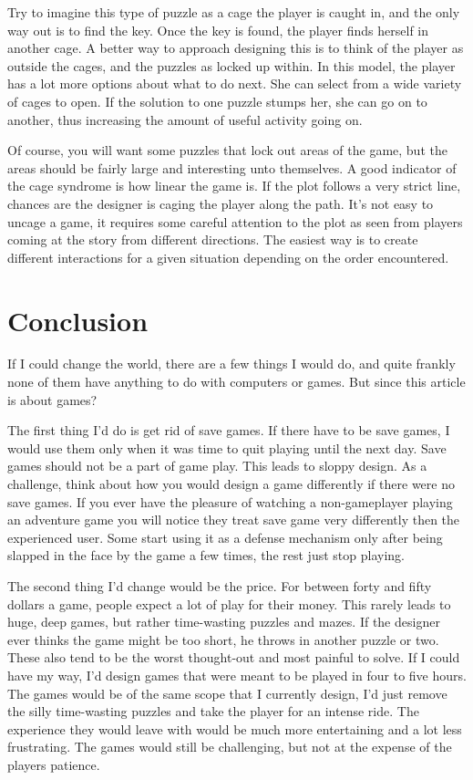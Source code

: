 \documentclass[12pt,letterpaper]{article}
\begin{document}
Try to imagine this type of puzzle as a cage the player is caught in, and the
only way out is to find the key. Once the key is found, the player finds
herself in another cage. A better way to approach designing this is to think of
the player as outside the cages, and the puzzles as locked up within. In this
model, the player has a lot more options about what to do next. She can select
from a wide variety of cages to open. If the solution to one puzzle stumps her,
she can go on to another, thus increasing the amount of useful activity going
on.

Of course, you will want some puzzles that lock out areas of the game, but the
areas should be fairly large and interesting unto themselves. A good indicator
of the cage syndrome is how linear the game is. If the plot follows a very
strict line, chances are the designer is caging the player along the path. It's
not easy to uncage a game, it requires some careful attention to the plot as
seen from players coming at the story from different directions. The easiest
way is to create different interactions for a given situation depending on the
order encountered.

\section*{Conclusion} If I could change the world, there are a few things I
would do, and quite frankly none of them have anything to do with computers or
games. But since this article is about games?

The first thing I'd do is get rid of save games. If there have to be save
games, I would use them only when it was time to quit playing until the next
day. Save games should not be a part of game play. This leads to sloppy design.
As a challenge, think about how you would design a game differently if there
were no save games. If you ever have the pleasure of watching a non-gameplayer
playing an adventure game you will notice they treat save game very differently
then the experienced user. Some start using it as a defense mechanism only
after being slapped in the face by the game a few times, the rest just stop
playing.

The second thing I'd change would be the price. For between forty and fifty
dollars a game, people expect a lot of play for their money. This rarely leads
to huge, deep games, but rather time-wasting puzzles and mazes. If the designer
ever thinks the game might be too short, he throws in another puzzle or two.
These also tend to be the worst thought-out and most painful to solve. If I
could have my way, I'd design games that were meant to be played in four to
five hours. The games would be of the same scope that I currently design, I'd
just remove the silly time-wasting puzzles and take the player for an intense
ride. The experience they would leave with would be much more entertaining and
a lot less frustrating. The games would still be challenging, but not at the
expense of the players patience.
\end{document}
